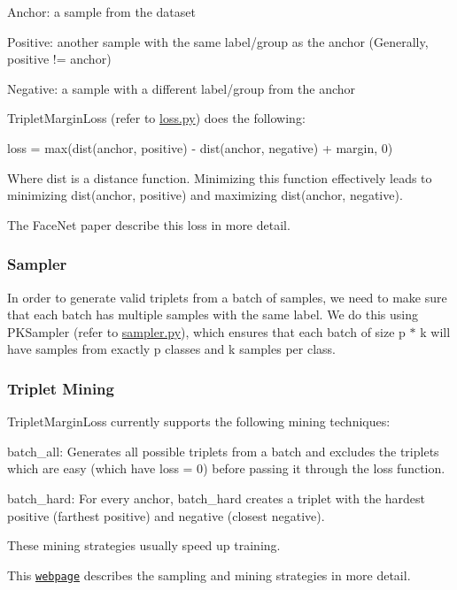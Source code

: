 \begin{DoxyEnumerate}
\item Anchor\+: a sample from the dataset
\item Positive\+: another sample with the same label/group as the anchor (Generally, positive != anchor)
\item Negative\+: a sample with a different label/group from the anchor
\end{DoxyEnumerate}

{\ttfamily Triplet\+Margin\+Loss} (refer to {\ttfamily \hyperlink{loss_8py_source}{loss.\+py}}) does the following\+:


\begin{DoxyCode}
loss = max(dist(anchor, positive) - dist(anchor, negative) + margin, 0)
\end{DoxyCode}
 Where {\ttfamily dist} is a distance function. Minimizing this function effectively leads to minimizing {\ttfamily dist(anchor, positive)} and maximizing {\ttfamily dist(anchor, negative)}.

The Face\+Net paper describe this loss in more detail.

\subsubsection*{Sampler}

In order to generate valid triplets from a batch of samples, we need to make sure that each batch has multiple samples with the same label. We do this using {\ttfamily P\+K\+Sampler} (refer to {\ttfamily \hyperlink{sampler_8py_source}{sampler.\+py}}), which ensures that each batch of size {\ttfamily p $\ast$ k} will have samples from exactly {\ttfamily p} classes and {\ttfamily k} samples per class.

\subsubsection*{Triplet Mining}

{\ttfamily Triplet\+Margin\+Loss} currently supports the following mining techniques\+:


\begin{DoxyItemize}
\item {\ttfamily batch\+\_\+all}\+: Generates all possible triplets from a batch and excludes the triplets which are \textquotesingle{}easy\textquotesingle{} (which have {\ttfamily loss = 0}) before passing it through the loss function.
\item {\ttfamily batch\+\_\+hard}\+: For every anchor, {\ttfamily batch\+\_\+hard} creates a triplet with the \textquotesingle{}hardest\textquotesingle{} positive (farthest positive) and negative (closest negative).
\end{DoxyItemize}

These mining strategies usually speed up training.

This \href{https://omoindrot.github.io/triplet-loss}{\tt webpage} describes the sampling and mining strategies in more detail. 